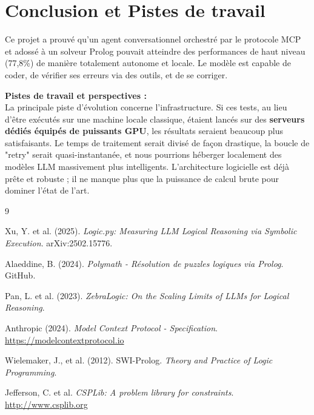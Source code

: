 \documentclass[12pt,a4paper]{article}
\begin{document}
\section{Conclusion et Pistes de travail}

Ce projet a prouvé qu'un agent conversationnel orchestré par le protocole MCP et adossé à un solveur Prolog pouvait atteindre des performances de haut niveau (77,8\%) de manière totalement autonome et locale. Le modèle est capable de coder, de vérifier ses erreurs via des outils, et de se corriger.

\textbf{Pistes de travail et perspectives :}\\
La principale piste d'évolution concerne l'infrastructure. Si ces tests, au lieu d'être exécutés sur une machine locale classique, étaient lancés sur des \textbf{serveurs dédiés équipés de puissants GPU}, les résultats seraient beaucoup plus satisfaisants. Le temps de traitement serait divisé de façon drastique, la boucle de "retry" serait quasi-instantanée, et nous pourrions héberger localement des modèles LLM massivement plus intelligents. L'architecture logicielle est déjà prête et robuste ; il ne manque plus que la puissance de calcul brute pour dominer l'état de l'art.

\begin{thebibliography}{9}

 Xu, Y. et al. (2025). \textit{Logic.py: Measuring LLM Logical Reasoning via Symbolic Execution}. arXiv:2502.15776.

 Alaeddine, B. (2024). \textit{Polymath - Résolution de puzzles logiques via Prolog}. GitHub.

 Pan, L. et al. (2023). \textit{ZebraLogic: On the Scaling Limits of LLMs for Logical Reasoning}.

 Anthropic (2024). \textit{Model Context Protocol - Specification}. \url{https://modelcontextprotocol.io}

 Wielemaker, J., et al. (2012). SWI-Prolog. \textit{Theory and Practice of Logic Programming}.

 Jefferson, C. et al. \textit{CSPLib: A problem library for constraints}. \url{http://www.csplib.org}

\end{thebibliography}
\end{document}
